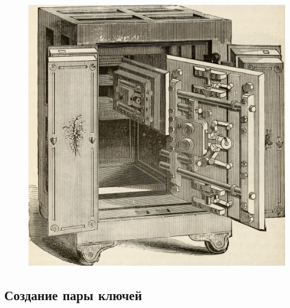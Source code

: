 \documentclass[presentation]{beamer}
\begin{document}
\begin{frame}{}
  \begin{figure}[htb]
    \centering
    \includegraphics[height=0.6\textheight]{safe-00}
  \end{figure}
\end{frame}



\subsection{Создание пары ключей}
\end{document}

